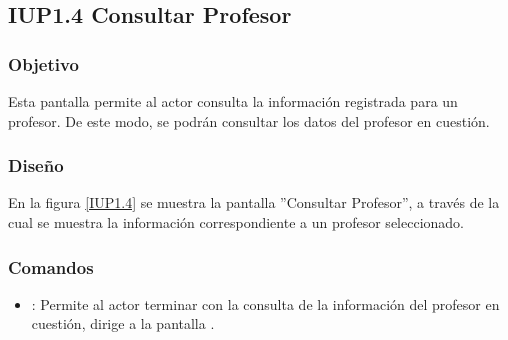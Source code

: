 \subsection{IUP1.4 Consultar Profesor}

\subsubsection{Objetivo}
	Esta pantalla permite al actor consulta la información registrada para un profesor. De este modo, se podrán consultar los datos del profesor en cuestión.
	
\subsubsection{Diseño}
	En la figura \ref{IUP1.4} se muestra la pantalla ''Consultar Profesor'', a través de la cual se muestra la información correspondiente a un profesor seleccionado. 


\subsubsection{Comandos}
\begin{itemize}
	\item {}: Permite al actor terminar con la consulta de la información del profesor en cuestión, dirige a la pantalla .
\end{itemize}
